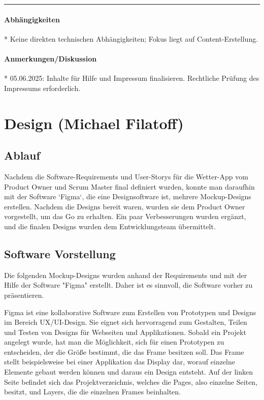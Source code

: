 \documentclass{article}
\begin{document}
\vspace{0.5em}
\hrule

\paragraph{Abhängigkeiten}
* Keine direkten technischen Abhängigkeiten; Fokus liegt auf Content-Erstellung.

\paragraph{Anmerkungen/Diskussion}
* 05.06.2025: Inhalte für Hilfe und Impressum finalisieren. Rechtliche Prüfung des Impressums erforderlich.

\normalsize

\section{Design \small{(Michael Filatoff)}}
\subsection{Ablauf}
Nachdem die Software-Requirements und User-Storys für die Wetter-App vom Product Owner und Scrum Master final definiert wurden, konnte man daraufhin mit der Software `Figma`, die eine Designsoftware ist, mehrere Mockup-Designs erstellen. Nachdem die Designs bereit waren, wurden sie dem Product Owner vorgestellt, um das Go zu erhalten. Ein paar Verbesserungen wurden ergänzt, und die finalen Designs wurden dem Entwicklungsteam übermittelt.

\subsection{Software Vorstellung}
Die folgenden Mockup-Designs wurden anhand der Requirements und mit der Hilfe der Software "Figma" erstellt. Daher ist es sinnvoll, die Software vorher zu präsentieren.

Figma ist eine kollaborative Software zum Erstellen von Prototypen und Designs im Bereich UX/UI-Design. Sie eignet sich hervorragend zum Gestalten, Teilen und Testen von Designs für Webseiten und Applikationen. Sobald ein Projekt angelegt wurde, hat man die Möglichkeit, sich für einen Prototypen zu entscheiden, der die Größe bestimmt, die das Frame besitzen soll. Das Frame stellt beispielsweise bei einer Applikation das Display dar, worauf einzelne Elemente gebaut werden können und daraus ein Design entsteht. Auf der linken Seite  befindet sich das Projektverzeichnis, welches die Pages, also einzelne Seiten, besitzt, und Layers, die die einzelnen Frames beinhalten. 
\end{document}
